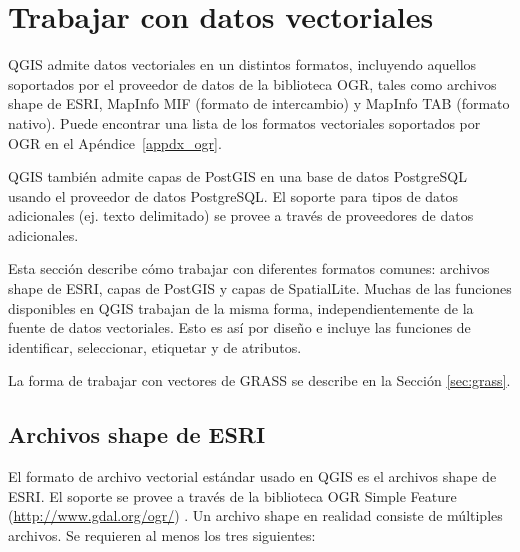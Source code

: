 
\section{Trabajar con datos vectoriales}\label{label_workingvector}



QGIS admite datos vectoriales en un distintos formatos, incluyendo aquellos soportados por el proveedor de datos de la biblioteca OGR, tales como archivos shape de ESRI,
MapInfo MIF (formato de intercambio)
y MapInfo TAB (formato nativo).
Puede encontrar una lista de los formatos vectoriales soportados por OGR en el Ap\'endice~\ref{appdx_ogr}.

QGIS también admite capas de PostGIS en una base de datos PostgreSQL usando el proveedor de datos PostgreSQL. El soporte para tipos de datos adicionales (ej. texto delimitado) se provee a trav\'es de proveedores de datos adicionales.

Esta secci\'on describe cómo trabajar con diferentes formatos comunes:
archivos shape de ESRI, capas de PostGIS y capas de SpatialLite. Muchas de las funciones disponibles en QGIS trabajan de la misma forma, independientemente de la fuente de datos vectoriales.
Esto es así por dise\~no e incluye las funciones de identificar, seleccionar, etiquetar y de atributos.

La forma de trabajar con vectores de GRASS se describe en la Secci\'on \ref{sec:grass}.

\subsection{Archivos shape de ESRI}

El formato de archivo vectorial estándar usado en QGIS es el archivos shape de ESRI. El soporte se provee a trav\'es de la biblioteca OGR Simple Feature (\url{http://www.gdal.org/ogr/})
. Un archivo shape en realidad consiste de m\'ultiples archivos. Se requieren al menos los tres siguientes:

